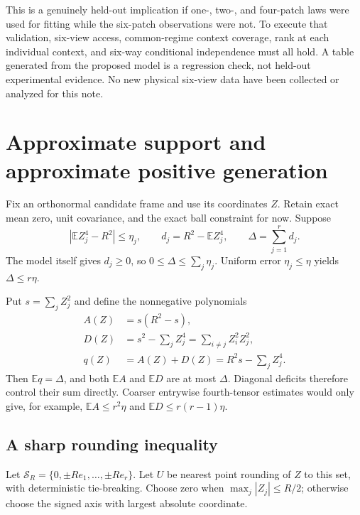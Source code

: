 \documentclass[11pt]{article}
\theoremstyle{definition}
\theoremstyle{remark}
\newcommand{\E}{\mathbb E}
\newcommand{\abs}[1]{\left\lvert#1\right\rvert}
\begin{document}
This is a genuinely held-out implication if one-, two-, and four-patch
laws were used for fitting while the six-patch observations were not.
To execute that validation, six-view access, common-regime context
coverage, rank at each individual context, and six-way conditional
independence must all hold. A table generated from the proposed model is a
regression check, not held-out experimental evidence. No new physical
six-view data have been collected or analyzed for this note.

\section{Approximate support and approximate positive generation}
\label{sec:approx}

Fix an orthonormal candidate frame and use its coordinates $Z$. Retain
exact mean zero, unit covariance, and the exact ball constraint for now.
Suppose
\begin{equation}
\abs{\E Z_j^4-R^2}\le\eta_j,
\qquad
d_j=R^2-\E Z_j^4,
\qquad
\Delta=\sum_{j=1}^r d_j.
\label{eq:deficits}
\end{equation}
The model itself gives $d_j\ge0$, so
$0\le\Delta\le\sum_j\eta_j$. Uniform error $\eta_j\le\eta$ yields
$\Delta\le r\eta$.

Put $s=\sum_j Z_j^2$ and define the nonnegative polynomials
\begin{align}
A(Z)&=s(R^2-s),\nonumber\\
D(Z)&=s^2-\sum_j Z_j^4=\sum_{i\ne j}Z_i^2Z_j^2,\nonumber\\
q(Z)&=A(Z)+D(Z)=R^2s-\sum_j Z_j^4.
\label{eq:defect-polynomials}
\end{align}
Then $\E q=\Delta$, and both $\E A$ and $\E D$ are at most $\Delta$.
Diagonal deficits therefore control their sum directly. Coarser
entrywise fourth-tensor estimates would only give, for example,
$\E A\le r^2\eta$ and $\E D\le r(r-1)\eta$.

\subsection{A sharp rounding inequality}

Let $\mathcal S_R=\{0,\pm Re_1,\ldots,\pm Re_r\}$. Let $U$ be nearest
point rounding of $Z$ to this set, with deterministic tie-breaking. Choose
zero when $\max_j|Z_j|\le R/2$; otherwise choose the signed axis with
largest absolute coordinate.
\end{document}
